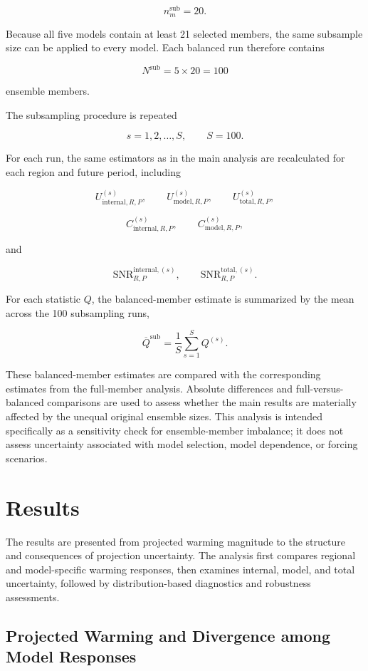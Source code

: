\documentclass[
]{krantz}
\begin{document}
\[
n_m^{\mathrm{sub}}=20.
\]

Because all five models contain at least 21 selected members, the same subsample size can be applied to every model. Each balanced run therefore contains

\[
N^{\mathrm{sub}}
=
5\times20
=
100
\]

ensemble members.

The subsampling procedure is repeated

\[
s=1,2,\ldots,S,
\qquad
S=100.
\]

For each run, the same estimators as in the main analysis are recalculated for each region and future period, including

\[
U_{\mathrm{internal},R,P}^{(s)},
\qquad
U_{\mathrm{model},R,P}^{(s)},
\qquad
U_{\mathrm{total},R,P}^{(s)},
\]

\[
C_{\mathrm{internal},R,P}^{(s)},
\qquad
C_{\mathrm{model},R,P}^{(s)},
\]

and

\[
\mathrm{SNR}^{\mathrm{internal},(s)}_{R,P},
\qquad
\mathrm{SNR}^{\mathrm{total},(s)}_{R,P}.
\]

For each statistic \(Q\), the balanced-member estimate is summarized by the mean across the 100 subsampling runs,

\[
\overline{Q}^{\mathrm{sub}}
=
\frac{1}{S}
\sum_{s=1}^{S}
Q^{(s)}.
\]

These balanced-member estimates are compared with the corresponding estimates from the full-member analysis. Absolute differences and full-versus-balanced comparisons are used to assess whether the main results are materially affected by the unequal original ensemble sizes. This analysis is intended specifically as a sensitivity check for ensemble-member imbalance; it does not assess uncertainty associated with model selection, model dependence, or forcing scenarios.

\section{Results}\label{results-5}

The results are presented from projected warming magnitude to the structure and consequences of projection uncertainty. The analysis first compares regional and model-specific warming responses, then examines internal, model, and total uncertainty, followed by distribution-based diagnostics and robustness assessments.

\subsection{Projected Warming and Divergence among Model Responses}\label{projected-warming-and-divergence-among-model-responses}
\end{document}
